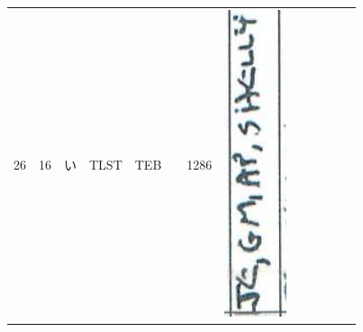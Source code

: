 \documentclass[10pt]{article}
\begin{document}
\begin{center}
\begin{tabular}{|c|c|c|c|c|c|c|c|c|c|c|c|c|}
26 & 16 & い & TLST & TEB &  & 1286 & \includegraphics[max width=\textwidth]{2025_02_27_dd68c3d38de88f0516d9g-073(1)}

\end{tabular}
\end{center}
\end{document}
